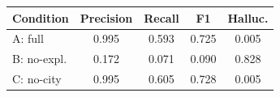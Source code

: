 \begin{tabular}{lcccc}
\toprule
Condition & Precision & Recall & F1 & Halluc. \\
\midrule
A: full & 0.995 & 0.593 & 0.725 & 0.005 \\
B: no-expl. & 0.172 & 0.071 & 0.090 & 0.828 \\
C: no-city & 0.995 & 0.605 & 0.728 & 0.005 \\
\bottomrule
\end{tabular}
